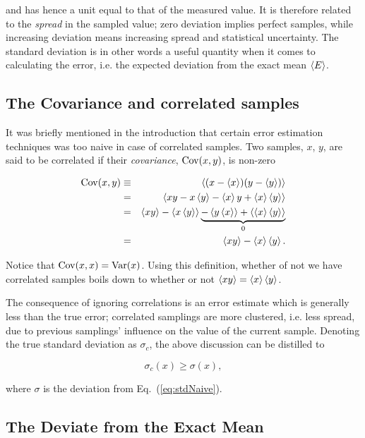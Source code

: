 and has hence a unit equal to that of the measured value. It is therefore related to the \textit{spread} in the sampled value; zero deviation implies perfect samples, while increasing deviation means increasing spread and statistical uncertainty. The standard deviation is in other words a useful quantity when it comes to calculating the error, i.e. the expected deviation from the exact mean $\left< E \right>$.

\subsection{The Covariance and correlated samples}

It was briefly mentioned in the introduction that certain error estimation techniques was too naive in case of correlated samples. Two samples, $x$, $y$, are said to be correlated if their \textit{covariance}, $\mathrm{Cov}(x, y)$, is non-zero

\begin{eqnarray}
\label{eq:covariance}
 \mathrm{Cov}(x, y) &\equiv& \left< (x - \left< x \right>)(y - \left< y \right>) \right> \nonumber\\
            &=& \left< xy - x\left< y \right> - \left< x \right>y + \left< x \right>\left< y \right> \right> \nonumber\\
            &=& \left< xy \right> - \left< x\left< y \right> \right> \underbrace{-\left< y\left< x \right> \right> + \left< \left< x \right>\left< y \right> \right>}_{0} \nonumber\\
            &=& \left< xy \right> - \left< x \right>\left< y \right>.
\end{eqnarray}

Notice that $\mathrm{Cov}(x,x) = \mathrm{Var}(x)$. Using this definition, whether of not we have correlated samples boils down to whether or not $\left< xy \right> = \left< x \right>\left< y \right>$. 

The consequence of ignoring correlations is an error estimate which is generally less than the true error; correlated samplings are more clustered, i.e. less spread, due to previous samplings' influence on the value of the current sample. Denoting the true standard deviation as $\sigma_c$, the above discussion can be distilled to

\begin{equation}
 \label{eq:trueVsNaiveSTD}
 \sigma_c(x) \ge \sigma(x),
\end{equation}

where $\sigma$ is the deviation from Eq.~(\ref{eq:stdNaive}). 


\subsection{The Deviate from the Exact Mean}


